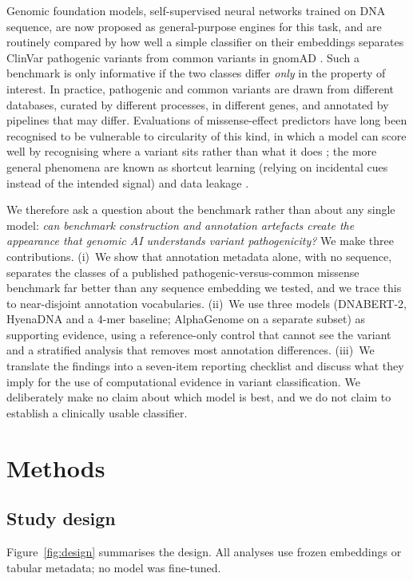 \documentclass[11pt]{article}
\begin{document}
Genomic foundation models, self-supervised neural networks trained on DNA sequence, are now proposed as general-purpose engines for this task, and are routinely compared by how well a simple classifier on their embeddings separates ClinVar pathogenic variants from common variants in gnomAD \citep{feng2025benchmark,benegas2023gpn,zhou2024dnabert2,nguyen2023hyenadna,avsec2026alphagenome}. Such a benchmark is only informative if the two classes differ \emph{only} in the property of interest. In practice, pathogenic and common variants are drawn from different databases, curated by different processes, in different genes, and annotated by pipelines that may differ. Evaluations of missense-effect predictors have long been recognised to be vulnerable to circularity of this kind, in which a model can score well by recognising where a variant sits rather than what it does \citep{grimm2015circularity}; the more general phenomena are known as shortcut learning (relying on incidental cues instead of the intended signal) and data leakage \citep{geirhos2020shortcut,kapoor2023leakage}.

We therefore ask a question about the benchmark rather than about any single model: \emph{can benchmark construction and annotation artefacts create the appearance that genomic AI understands variant pathogenicity?} We make three contributions. (i)~We show that annotation metadata alone, with no sequence, separates the classes of a published pathogenic-versus-common missense benchmark far better than any sequence embedding we tested, and we trace this to near-disjoint annotation vocabularies. (ii)~We use three models (DNABERT-2, HyenaDNA and a 4-mer baseline; AlphaGenome on a separate subset) as supporting evidence, using a reference-only control that cannot see the variant and a stratified analysis that removes most annotation differences. (iii)~We translate the findings into a seven-item reporting checklist and discuss what they imply for the use of computational evidence in variant classification. We deliberately make no claim about which model is best, and we do not claim to establish a clinically usable classifier.

\section{Methods}
\subsection{Study design}
Figure~\ref{fig:design} summarises the design. All analyses use frozen embeddings or tabular metadata; no model was fine-tuned.
\end{document}

